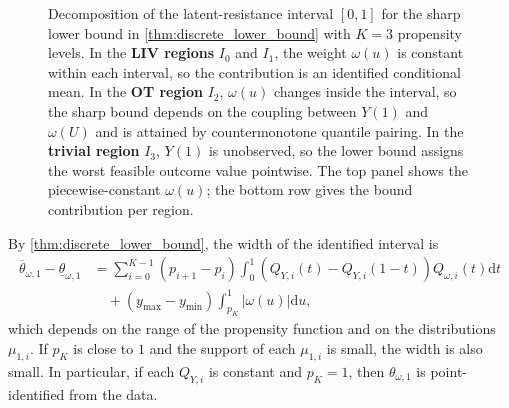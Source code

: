 \begin{figure}[!htbp]
\caption{Decomposition of the latent-resistance interval $[0,1]$ for the sharp lower bound in \cref{thm:discrete_lower_bound} with $K=3$ propensity levels. In the \textbf{\color{teal!65}LIV regions} $I_0$ and $I_1$, the weight $\omega(u)$ is constant within each interval, so the contribution is an identified conditional mean. In the \textbf{\color{blue!65}OT region} $I_2$, $\omega(u)$ changes inside the interval, so the sharp bound depends on the coupling between $Y(1)$ and $\omega(U)$ and is attained by countermonotone quantile pairing. In the \textbf{\color{orange!65}trivial region} $I_3$, $Y(1)$ is unobserved, so the lower bound assigns the worst feasible outcome value pointwise. The top panel shows the piecewise-constant $\omega(u)$; the bottom row gives the bound contribution per region.}
\label{fig:decomposition}
\end{figure}

By \cref{thm:discrete_lower_bound}, the width of the identified interval is
\begin{equation*}
\begin{aligned}
\overline{\theta }_{\omega ,1} -\underline{\theta }_{\omega ,1}
& =\sum _{i=0}^{K-1} (p_{i+1} -p_{i} )\int _{0}^{1}( Q_{Y,i} (t)-Q_{Y,i}( 1-t)) Q_{\omega ,i} (t) \mathrm{d} t \\
& \quad + ( y_{\max} -y_{\min})\int _{p_{K}}^{1} |\omega (u)| \mathrm{d} u,
\end{aligned}
\end{equation*}
which depends on the range of the propensity function and on the distributions $\mu_{1,i}$. If $p_K$ is close to $1$ and the support of each $\mu_{1,i}$ is small, the width is also small. In particular, if each $Q_{Y,i}$ is constant and $p_K = 1$, then $\theta_{\omega,1}$ is point-identified from the data.

